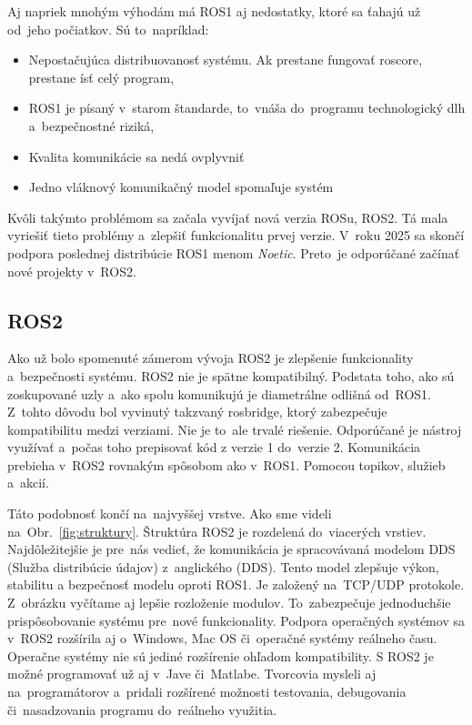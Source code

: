 \pagebreak

Aj napriek mnohým výhodám má ROS1 aj nedostatky, ktoré sa ťahajú už od~jeho počiatkov. Sú to~napríklad:
\begin{itemize}
	\item Nepostačujúca distribuovanosť systému. Ak prestane fungovať roscore, prestane ísť celý program,
	\item ROS1 je písaný v~starom štandarde, to~vnáša do~programu technologický dlh a~bezpečnostné riziká,
	\item Kvalita komunikácie sa nedá ovplyvniť
	\item Jedno vláknový komunikačný model spomaľuje systém
\end{itemize}

Kvôli takýmto problémom sa začala vyvíjať nová verzia ROSu, ROS2. Tá mala vyriešiť tieto problémy a~zlepšiť funkcionalitu prvej verzie. V~roku 2025 sa skončí
podpora poslednej distribúcie ROS1 menom \textit{Noetic}. Preto~je odporúčané začínať nové projekty v~ROS2.

\subsection{ROS2}

Ako už bolo spomenuté zámerom vývoja ROS2 je zlepšenie funkcionality a~bezpečnosti systému. ROS2 nie je spätne kompatibilný.
Podstata toho, ako sú zoskupované uzly a~ako spolu komunikujú je diametrálne odlišná od~ROS1. Z~tohto dôvodu bol vyvinutý takzvaný rosbridge,
ktorý zabezpečuje kompatibilitu medzi verziami. Nie je to~ale trvalé riešenie. Odporúčané je nástroj využívať a~počas toho prepisovať kód
z verzie 1 do~verzie 2. Komunikácia prebieha \newline v~ROS2 rovnakým spôsobom ako v~ROS1. Pomocou topikov, služieb a~akcií.

Táto podobnosť končí na~najvyššej vrstve. Ako sme videli na~Obr.~\ref{fig:struktury}. Štruktúra ROS2 je rozdelená do~viacerých vrstiev.
Najdôležitejšie je pre~nás vedieť, že komunikácia je spracovávaná modelom DDS (Služba distribúcie údajov) z~anglického (\acrlong{DDS}). Tento model zlepšuje výkon, stabilitu
a bezpečnosť modelu oproti ROS1. Je založený na~TCP/UDP protokole. Z~obrázku vyčítame aj lepšie rozloženie modulov. To~zabezpečuje jednoduchšie
prispôsobovanie systému pre~nové funkcionality. Podpora operačných systémov sa v~ROS2 rozšírila aj o~Windows, Mac OS či~operačné systémy reálneho času.
Operačne systémy nie sú jediné rozšírenie ohľadom kompatibility. S ROS2 je možné programovať už aj v~Jave či~Matlabe.
Tvorcovia mysleli aj na~programátorov a~pridali rozšírené možnosti testovania, debugovania či~nasadzovania programu do~reálneho využitia.


